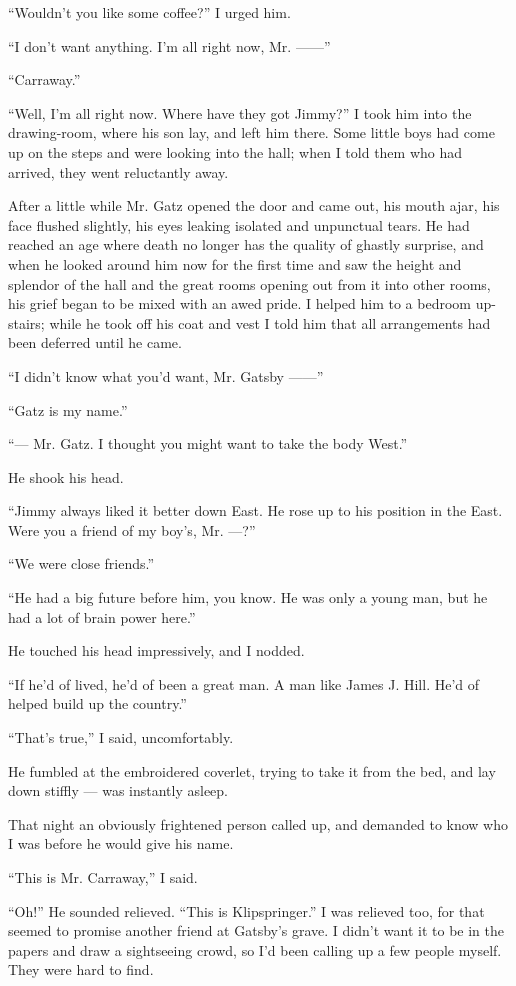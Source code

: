 \documentclass{znotebook}
\begin{document}
``Wouldn’t you like some coffee?'' I urged him.

``I don’t want anything. I’m all right now, Mr. ——''

``Carraway.''

``Well, I’m all right now. Where have they got Jimmy?'' I took him into the drawing-room, where his son lay, and left him there. Some little boys had come up on the steps and were looking into the hall; when I told them who had arrived, they went reluctantly away.

After a little while Mr. Gatz opened the door and came out, his mouth ajar, his face flushed slightly, his eyes leaking isolated and unpunctual tears. He had reached an age where death no longer has the quality of ghastly surprise, and when he looked around him now for the first time and saw the height and splendor of the hall and the great rooms opening out from it into other rooms, his grief began to be mixed with an awed pride. I helped him to a bedroom up-stairs; while he took off his coat and vest I told him that all arrangements had been deferred until he came.

``I didn’t know what you’d want, Mr. Gatsby ——''

``Gatz is my name.''

``— Mr. Gatz. I thought you might want to take the body West.''

He shook his head.

``Jimmy always liked it better down East. He rose up to his position in the East. Were you a friend of my boy’s, Mr. —?''

``We were close friends.''

``He had a big future before him, you know. He was only a young man, but he had a lot of brain power here.''

He touched his head impressively, and I nodded.

``If he’d of lived, he’d of been a great man. A man like James J. Hill. He’d of helped build up the country.''

``That’s true,'' I said, uncomfortably.

He fumbled at the embroidered coverlet, trying to take it from the bed, and lay down stiffly — was instantly asleep.

That night an obviously frightened person called up, and demanded to know who I was before he would give his name.

``This is Mr. Carraway,'' I said.

``Oh!'' He sounded relieved. ``This is Klipspringer.'' I was relieved too, for that seemed to promise another friend at Gatsby’s grave. I didn’t want it to be in the papers and draw a sightseeing crowd, so I’d been calling up a few people myself. They were hard to find.
\end{document}
